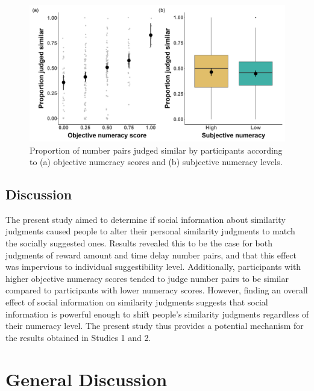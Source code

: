 \documentclass[
  pub,floatsintext]{apa6}
\begin{document}
\begin{figure}

{\centering \includegraphics[width=0.8\linewidth]{figures/numeracy_judgments_3} 

}

\caption{Proportion of number pairs judged similar by participants according to (a) objective numeracy scores and (b) subjective numeracy levels.}\label{fig:numeracyjudgments3}
\end{figure}

\hypertarget{discussion-2}{%
\subsection{Discussion}\label{discussion-2}}

The present study aimed to determine if social information about similarity judgments caused people to alter their personal similarity judgments to match the socially suggested ones. Results revealed this to be the case for both judgments of reward amount and time delay number pairs, and that this effect was impervious to individual suggestibility level. Additionally, participants with higher objective numeracy scores tended to judge number pairs to be similar compared to participants with lower numeracy scores. However, finding an overall effect of social information on similarity judgments suggests that social information is powerful enough to shift people's similarity judgments regardless of their numeracy level. The present study thus provides a potential mechanism for the results obtained in Studies 1 and 2.

\hypertarget{general-discussion}{%
\section{General Discussion}\label{general-discussion}}
\end{document}

